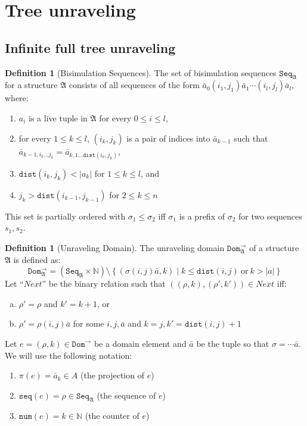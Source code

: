 \documentclass[draft]{scrartcl}
\theoremstyle{definition}
\newtheorem{definition}[theorem]{Definition}
\newcommand{\str}[1]{\mathfrak{#1}}
\newcommand{\seqset}[1]{\mathtt{Seq}_{#1}}
\newcommand{\seq}[1]{\mathtt{seq}({#1})}
\newcommand{\num}[1]{\mathtt{num}({#1})}
\newcommand{\dist}[2]{\mathtt{dist}({#1},{#2})}
\begin{document}
\pagebreak

\section{Tree unraveling}

\subsection{Infinite full tree unraveling}

\begin{definition}[Bisimulation Sequences]
  The set of bisimulation sequences $\seqset{\str{A}}$ for a structure $\str{A}$ consists of all sequences of the form $\bar{a}_{0}(i_{1}, j_{1})\bar{a}_{1}\cdots{}(i_{l},j_{l})\bar{a}_{l}$, where:
  \begin{enumerate}[(1)]
    \item $a_{i}$ is a live tuple in $\str{A}$ for every $0 \le i \le l$,
    \item for every $1 \le k \le l$, $(i_{k}, j_{k})$ is a pair of indices into $\bar{a}_{k-1}$ such that $\bar{a}_{k-1,i_{k}\ldots{}j_{k}} = \bar{a}_{k,1\ldots{\dist{i_{k}}{j_{k}}}}$,
    \item $\dist{i_{k}}{j_{k}} < |a_{k}|$ for $1 \le k \le l$, and
    \item $j_{k} > \dist{i_{k-1}}{j_{k-1}}$ for $2 \le k \le n$
  \end{enumerate}
  This set is partially ordered with $\sigma_{1} \le \sigma_{2}$ iff $\sigma_{1}$ is a prefix of $\sigma_{2}$ for two sequences $s_{1}, s_{2}$.
\end{definition}

\begin{definition}[Unraveling Domain]
  The unraveling domain $\mathtt{Dom}^{\rightarrow}_{\str{A}}$ of a structure $\str{A}$ is defined as:
  \begin{equation*}
    \mathtt{Dom}^{\rightarrow}_{\str{A}}
      = (\seqset{\str{A}} \times \mathbb{N})
        \setminus
        \left\{ (\sigma(i,j)\bar{a}, k) \mid k \le \dist{i}{j}\ \text{or}\ k > |a| \right\}
  \end{equation*}
  Let ``$\mathit{Next}$'' be the binary relation such that $((\rho, k), (\rho', k')) \in \mathit{Next}$ iff:
  \begin{enumerate}[(a)]
    \item $\rho' = \rho$ and $k' = k + 1$, or
    \item $\rho' = \rho (i,j) \bar{a}$ for some $i, j, \bar{a}$ and $k = j, k' = \dist{i}{j} + 1$
  \end{enumerate}
  Let $e = (\rho, k) \in \mathtt{Dom}^{\rightarrow}$ be a domain element and $\bar{a}$ be the tuple so that $\sigma = \cdots{}\bar{a}$.
  We will use the following notation:
  \begin{enumerate}
    \item $\pi(e) = \bar{a}_{k} \in A$ (the projection of $e$)
    \item $\seq{e} = \rho \in \seqset{\str{A}}$ (the sequence of $e$)
    \item $\num{e} = k \in \mathbb{N}$ (the counter of $e$)
  \end{enumerate}
\end{definition}
\end{document}
